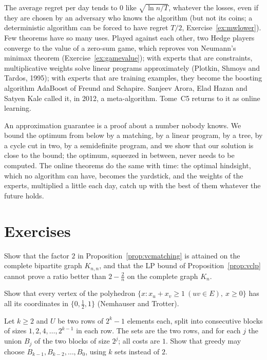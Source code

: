 The average regret per day tends to $0$ like $\sqrt{\ln n/T}$, whatever the losses, even if they are chosen by an adversary who knows the algorithm (but not its coins; a deterministic algorithm can be forced to have regret $T/2$, Exercise~\ref{ex:mwlower}). Few theorems have so many uses. Played against each other, two Hedge players converge to the value of a zero-sum game, which reproves von Neumann's minimax theorem (Exercise~\ref{ex:gamevalue}); with experts that are constraints, multiplicative weights solve linear programs approximately (Plotkin, Shmoys and Tardos, 1995); with experts that are training examples, they become the boosting algorithm AdaBoost of Freund and Schapire. Sanjeev Arora, Elad Hazan and Satyen Kale called it, in 2012, a meta-algorithm. Tome~C5 returns to it as online learning.

\begin{beauty}
An approximation guarantee is a proof about a number nobody knows. We bound the optimum from below by a matching, by a linear program, by a tree, by a cycle cut in two, by a semidefinite program, and we show that our solution is close to the bound; the optimum, squeezed in between, never needs to be computed. The online theorems do the same with time: the optimal hindsight, which no algorithm can have, becomes the yardstick, and the weights of the experts, multiplied a little each day, catch up with the best of them whatever the future holds.
\end{beauty}

\section{Exercises}

\begin{exercise}[$\star$]\label{ex:vcmatching}
Show that the factor $2$ in Proposition~\ref{prop:vcmatching} is attained on the complete bipartite graph $K_{n,n}$, and that the LP bound of Proposition~\ref{prop:vclp} cannot prove a ratio better than $2-\frac2n$ on the complete graph $K_n$.
\end{exercise}

\begin{exercise}[$\star\star$]\label{ex:vclphalf}
Show that every vertex of the polyhedron $\{x:x_u+x_v\ge1\ (uv\in E),\ x\ge0\}$ has all its coordinates in $\{0,\frac12,1\}$ (Nemhauser and Trotter).
\end{exercise}

\begin{exercise}[$\star\star$]\label{ex:setcovertight}
Let $k\ge2$ and $U$ be two rows of $2^k-1$ elements each, split into consecutive blocks of sizes $1,2,4,\dots,2^{k-1}$ in each row. The sets are the two rows, and for each $j$ the union $B_j$ of the two blocks of size $2^{j}$; all costs are $1$. Show that greedy may choose $B_{k-1},B_{k-2},\dots,B_0$, using $k$ sets instead of $2$.
\end{exercise}

